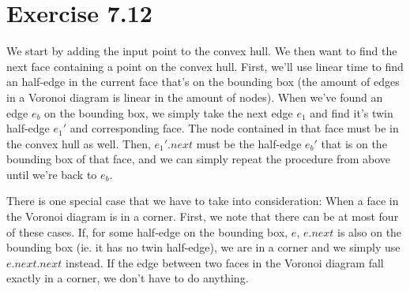 \documentclass[11pt,a4paper]{article}
\begin{document}
\section{Exercise 7.12}


We start by adding the input point to the convex hull. We then want to
find the next face containing a point on the convex hull. First, we'll
use linear time to find an half-edge in the current face that's on the
bounding box (the amount of edges in a Voronoi diagram is linear in
the amount of nodes). When we've found an edge $e_b$ on the bounding
box, we simply take the next edge $e_1$ and find it's twin half-edge
$e_1'$ and corresponding face. The node contained in that face must be
in the convex hull as well. Then, $e_1'.next$ must be the half-edge
$e_b'$ that is on the bounding box of that face, and we can simply
repeat the procedure from above until we're back to $e_b$.

There is one special case that we have to take into consideration:
When a face in the Voronoi diagram is in a corner. First, we note that
there can be at most four of these cases. If, for some half-edge on
the bounding box, $e$, $e.next$ is also on the bounding box (ie. it
has no twin half-edge), we are in a corner and we simply use
$e.next.next$ instead. If the edge between two faces in the Voronoi
diagram fall exactly in a corner, we don't have to do anything.
\end{document}
